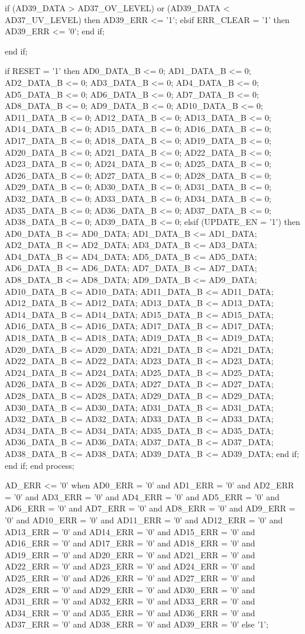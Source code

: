 \begin{mylisting}[language=VHDL,caption=AD変換モジュール,label=appF_ADC_module_VHDL]
				if (AD39_DATA > AD37_OV_LEVEL) or (AD39_DATA < AD37_UV_LEVEL) then
					AD39_ERR	<= '1';
				elsif ERR_CLEAR = '1' then
					AD39_ERR	<= '0';
				end if;
				
			end if;
			
			if RESET = '1' then
				AD0_DATA_B	<= 0;
				AD1_DATA_B	<= 0;
				AD2_DATA_B	<= 0;
				AD3_DATA_B	<= 0;
				AD4_DATA_B	<= 0;
				AD5_DATA_B	<= 0;
				AD6_DATA_B	<= 0;
				AD7_DATA_B	<= 0;
				AD8_DATA_B	<= 0;
				AD9_DATA_B	<= 0;
				AD10_DATA_B	<= 0;
				AD11_DATA_B	<= 0;
				AD12_DATA_B	<= 0;
				AD13_DATA_B	<= 0;
				AD14_DATA_B	<= 0;
				AD15_DATA_B	<= 0;
				AD16_DATA_B	<= 0;
				AD17_DATA_B	<= 0;
				AD18_DATA_B	<= 0;
				AD19_DATA_B	<= 0;
				AD20_DATA_B	<= 0;
				AD21_DATA_B	<= 0;
				AD22_DATA_B	<= 0;
				AD23_DATA_B	<= 0;
				AD24_DATA_B	<= 0;
				AD25_DATA_B	<= 0;
				AD26_DATA_B	<= 0;
				AD27_DATA_B	<= 0;
				AD28_DATA_B	<= 0;
				AD29_DATA_B	<= 0;
				AD30_DATA_B	<= 0;
				AD31_DATA_B	<= 0;
				AD32_DATA_B	<= 0;
				AD33_DATA_B	<= 0;
				AD34_DATA_B	<= 0;
				AD35_DATA_B	<= 0;
				AD36_DATA_B	<= 0;
				AD37_DATA_B	<= 0;
				AD38_DATA_B	<= 0;
				AD39_DATA_B	<= 0;
			elsif (UPDATE_EN = '1') then
				AD0_DATA_B	<= AD0_DATA;
				AD1_DATA_B	<= AD1_DATA;
				AD2_DATA_B	<= AD2_DATA;
				AD3_DATA_B	<= AD3_DATA;
				AD4_DATA_B	<= AD4_DATA;
				AD5_DATA_B	<= AD5_DATA;
				AD6_DATA_B	<= AD6_DATA;
				AD7_DATA_B	<= AD7_DATA;
				AD8_DATA_B	<= AD8_DATA;
				AD9_DATA_B	<= AD9_DATA;
				AD10_DATA_B	<= AD10_DATA;
				AD11_DATA_B	<= AD11_DATA;
				AD12_DATA_B	<= AD12_DATA;
				AD13_DATA_B	<= AD13_DATA;
				AD14_DATA_B	<= AD14_DATA;
				AD15_DATA_B	<= AD15_DATA;
				AD16_DATA_B	<= AD16_DATA;
				AD17_DATA_B	<= AD17_DATA;
				AD18_DATA_B	<= AD18_DATA;
				AD19_DATA_B	<= AD19_DATA;
				AD20_DATA_B	<= AD20_DATA;
				AD21_DATA_B	<= AD21_DATA;
				AD22_DATA_B	<= AD22_DATA;
				AD23_DATA_B	<= AD23_DATA;
				AD24_DATA_B	<= AD24_DATA;
				AD25_DATA_B	<= AD25_DATA;
				AD26_DATA_B	<= AD26_DATA;
				AD27_DATA_B	<= AD27_DATA;
				AD28_DATA_B	<= AD28_DATA;
				AD29_DATA_B	<= AD29_DATA;
				AD30_DATA_B	<= AD30_DATA;
				AD31_DATA_B	<= AD31_DATA;
				AD32_DATA_B	<= AD32_DATA;
				AD33_DATA_B	<= AD33_DATA;
				AD34_DATA_B	<= AD34_DATA;
				AD35_DATA_B	<= AD35_DATA;
				AD36_DATA_B	<= AD36_DATA;
				AD37_DATA_B	<= AD37_DATA;
				AD38_DATA_B	<= AD38_DATA;
				AD39_DATA_B	<= AD39_DATA;
			end if;
		end if;
	end process;

	AD_ERR	<= '0' when AD0_ERR = '0' and AD1_ERR = '0' and AD2_ERR = '0' and AD3_ERR = '0' and AD4_ERR = '0' and AD5_ERR = '0' and AD6_ERR = '0' and AD7_ERR = '0' and 
					AD8_ERR = '0' and AD9_ERR = '0' and AD10_ERR = '0' and AD11_ERR = '0' and AD12_ERR = '0' and AD13_ERR = '0' and AD14_ERR = '0' and AD15_ERR = '0' and 
					AD16_ERR = '0' and AD17_ERR = '0' and AD18_ERR = '0' and AD19_ERR = '0' and AD20_ERR = '0' and AD21_ERR = '0' and AD22_ERR = '0' and AD23_ERR = '0' and 
					AD24_ERR = '0' and AD25_ERR = '0' and AD26_ERR = '0' and AD27_ERR = '0' and AD28_ERR = '0' and AD29_ERR = '0' and AD30_ERR = '0' and AD31_ERR = '0' and 
					AD32_ERR = '0' and AD33_ERR = '0' and AD34_ERR = '0' and AD35_ERR = '0' and AD36_ERR = '0' and AD37_ERR = '0' and AD38_ERR = '0' and AD39_ERR = '0'
				else '1';


\end{mylisting}
